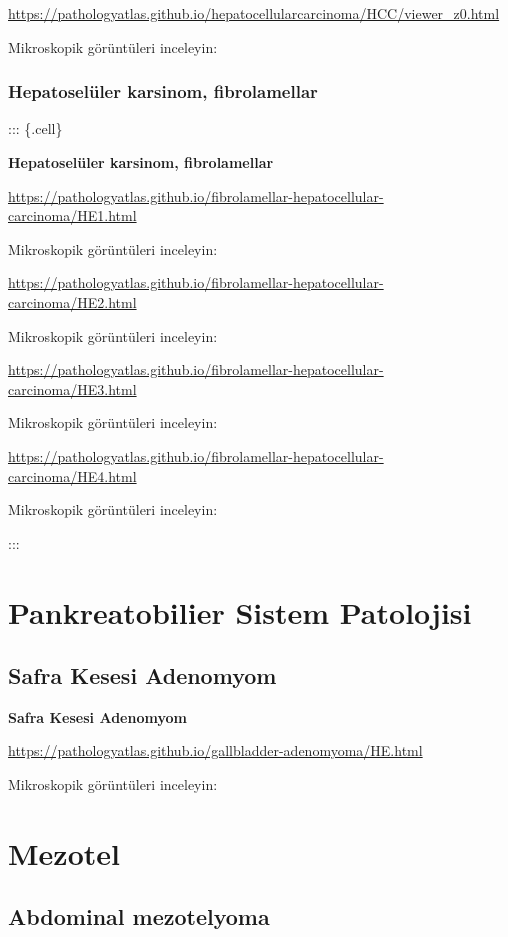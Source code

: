 \documentclass[
  letterpaper,
  DIV=11,
  numbers=noendperiod]{scrreprt}
\begin{document}
\url{https://pathologyatlas.github.io/hepatocellularcarcinoma/HCC/viewer_z0.html}

Mikroskopik görüntüleri inceleyin:

\hypertarget{hepatoseluxfcler-karsinom-fibrolamellar}{%
\section{Hepatoselüler karsinom,
fibrolamellar}\label{hepatoseluxfcler-karsinom-fibrolamellar}}

::: \{.cell\}

\textbf{Hepatoselüler karsinom, fibrolamellar}

\url{https://pathologyatlas.github.io/fibrolamellar-hepatocellular-carcinoma/HE1.html}

Mikroskopik görüntüleri inceleyin:

\url{https://pathologyatlas.github.io/fibrolamellar-hepatocellular-carcinoma/HE2.html}

Mikroskopik görüntüleri inceleyin:

\url{https://pathologyatlas.github.io/fibrolamellar-hepatocellular-carcinoma/HE3.html}

Mikroskopik görüntüleri inceleyin:

\url{https://pathologyatlas.github.io/fibrolamellar-hepatocellular-carcinoma/HE4.html}

Mikroskopik görüntüleri inceleyin:

:::

\part{Pankreatobilier Sistem Patolojisi}

\hypertarget{safra-kesesi-adenomyom}{%
\chapter{Safra Kesesi Adenomyom}\label{safra-kesesi-adenomyom}}

\textbf{Safra Kesesi Adenomyom}

\url{https://pathologyatlas.github.io/gallbladder-adenomyoma/HE.html}

Mikroskopik görüntüleri inceleyin:

\part{Mezotel}

\hypertarget{abdominal-mezotelyoma}{%
\chapter{Abdominal mezotelyoma}\label{abdominal-mezotelyoma}}
\end{document}
